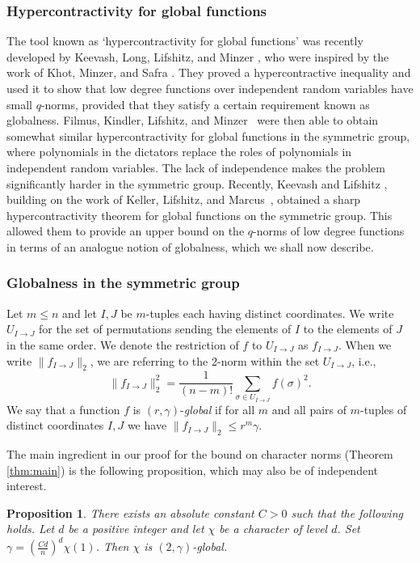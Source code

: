 \documentclass[11pt, letterpaper]{amsart}
\newtheorem{proposition}[thm]{Proposition}
\renewcommand\le{\leqslant}
\begin{document}
\subsubsection*{Hypercontractivity for global functions}
The tool known as `hypercontractivity for global functions' was recently developed by Keevash, Long, Lifshitz, and Minzer \cite{keevash2021global}, who were inspired by the work of Khot, Minzer, and Safra \cite{khot2018pseudorandom}. They proved a hypercontractive inequality and used it to show that low degree functions over independent random variables have small $q$-norms, provided that they satisfy a certain requirement known as globalness.  Filmus, Kindler, Lifshitz, and Minzer~\cite{filmus2020hypercontractivity} were then able to obtain somewhat similar hypercontractivity for global functions in the symmetric group, where polynomials in the dictators replace the roles of polynomials in independent random variables. The lack of independence makes the problem significantly harder in the symmetric group. Recently, Keevash and Lifshitz \cite{keevash2023sharp}, building on the work of Keller, Lifshitz, and Marcus~\cite{Keller2023sharp}, obtained a sharp hypercontractivity theorem for global functions on the symmetric group. This allowed them to provide an upper bound on the $q$-norms of low degree functions in terms of an analogue notion of globalness, which we shall now describe.  
 \subsubsection*{Globalness in the symmetric group}
Let $m\le n$ and let $I,J$ be $m$-tuples each having distinct coordinates. 
We write $U_{I\to J}$ for the set of permutations sending the elements of $I$ to the elements of $J$ in the same order. We denote the restriction of $f$ 
to $U_{I\to J}$ as $f_{I\to J}$. When we write $\|f_{I\to J}\|_2$, we are referring to the 2-norm within the set $U_{I\to J}$, i.e.,
\[\|f_{I\to J}\|_2^2=\frac{1}{(n-m)!}\sum_{\sigma\in U_{I\to J}}f(\sigma)^2.\]
We say that a function $f$ is $(r,\gamma)$-\emph{global} if for all $m$ and all pairs of $m$-tuples of distinct coordinates $I,J$ we have $\|f_{I\to J}\|_2 \le r^{m}\gamma$. 

The main ingredient in our proof for the bound on character norms (Theorem \ref{thm:main}) is the following proposition, which may also be of independent interest. 
\begin{proposition}\label{prop:characters are global}
There exists an absolute constant $C>0$ such that the following holds. Let $d$ be a positive integer and let $\chi$ be a character of level $d$. Set  $\gamma = \left(\frac{Cd}{n}\right)^d\chi(1)$. Then $\chi$ is $(2, \gamma)$-global. 
\end{proposition}
\end{document}
